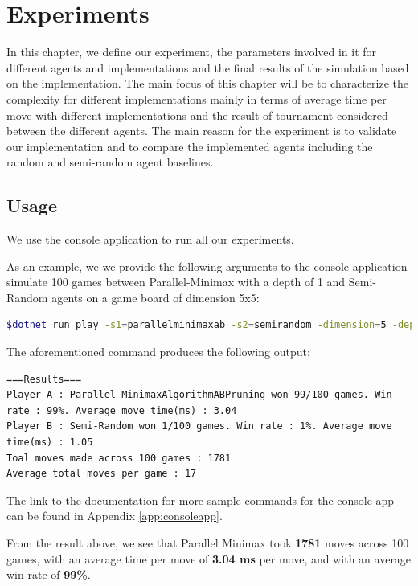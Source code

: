 \chapter{Experiments} \label{Experiments}

In this chapter, we define our experiment, the parameters involved in it for different agents and implementations and the final results of the simulation based on the implementation. The main focus of this chapter will be to characterize the complexity for different implementations mainly in terms of average time per move with different implementations and the result of tournament considered between the different agents. The main reason for the experiment is to validate our implementation and to compare the implemented agents including the random and semi-random agent baselines.

\section{Usage}

We use the console application to run all our experiments.

As an example, we we provide the following arguments to the console application simulate 100 games between Parallel-Minimax with a depth of 1 and Semi-Random agents on a game board of dimension 5x5:

\begin{lstlisting}[language=bash]
$dotnet run play -s1=parallelminimaxab -s2=semirandom -dimension=5 -depth=1 -sim -numsim=100
\end{lstlisting}

The aforementioned command produces the following output:

\begin{lstlisting}
===Results===
Player A : Parallel MinimaxAlgorithmABPruning won 99/100 games. Win rate : 99%. Average move time(ms) : 3.04
Player B : Semi-Random won 1/100 games. Win rate : 1%. Average move time(ms) : 1.05
Toal moves made across 100 games : 1781
Average total moves per game : 17
\end{lstlisting}

The link to the documentation for more sample commands for the console app can be found in Appendix \ref{app:consoleapp}.

From the result above, we see that Parallel Minimax took \textbf{1781} moves across 100 games, with an average time per move of \textbf{3.04 ms} per move, and with an average win rate of \textbf{99\%}.

